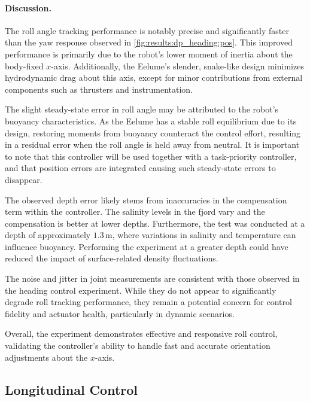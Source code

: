 \paragraph{Discussion.}

The roll angle tracking performance is notably precise and significantly 
faster than the yaw response observed in \autoref{fig:results:dp_heading:pos}. 
This improved performance is primarily due to the robot’s lower moment of 
inertia about the body-fixed \(x\)-axis. Additionally, the Eelume’s slender, 
snake-like design minimizes hydrodynamic drag about this axis, except for 
minor contributions from external components such as thrusters and instrumentation.

The slight steady-state error in roll angle may be attributed to the robot’s 
buoyancy characteristics. As the Eelume has a stable roll equilibrium due to 
its design, restoring moments from buoyancy counteract the control effort, 
resulting in a residual error when the roll angle is held away from neutral.
It is important to note that this controller will be used together with a
task-priority controller, and that position errors are integrated causing such steady-state
errors to disappear.

The observed depth error likely stems from inaccuracies in the compensation 
term within the controller. The salinity levels in the fjord vary and the
compensation is better at lower depths.
Furthermore, the test was conducted at a depth of 
approximately \(1.3\,\mathrm{m}\), where variations in salinity and 
temperature can influence buoyancy. Performing the experiment at a greater 
depth could have reduced the impact of surface-related density fluctuations.

The noise and jitter in joint measurements are consistent with those observed 
in the heading control experiment. While they do not appear to significantly 
degrade roll tracking performance, they remain a potential concern for control 
fidelity and actuator health, particularly in dynamic scenarios.

Overall, the experiment demonstrates effective and responsive roll control, 
validating the controller’s ability to handle fast and accurate orientation 
adjustments about the \(x\)-axis.

\FloatBarrier


\subsection{Longitudinal Control}

